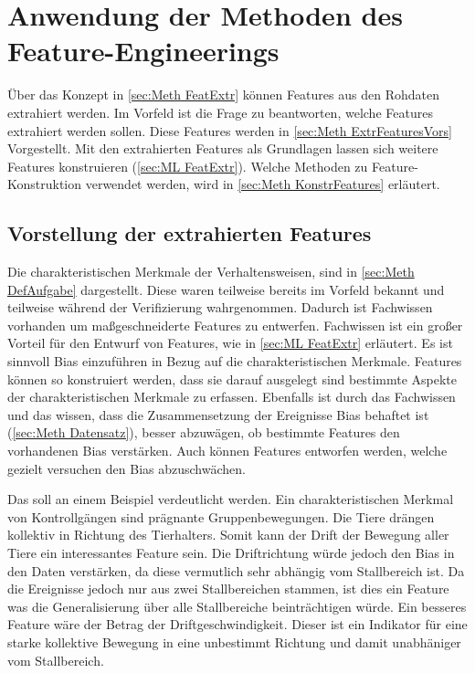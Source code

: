 \section{Anwendung der Methoden des Feature-Engineerings}
Über das Konzept in \autoref{sec:Meth FeatExtr} können Features aus den Rohdaten extrahiert werden. Im Vorfeld ist die Frage zu beantworten, welche Features extrahiert werden sollen. Diese Features werden in \autoref{sec:Meth ExtrFeaturesVors} Vorgestellt. Mit den extrahierten Features als Grundlagen lassen sich weitere Features konstruieren (\autoref{sec:ML FeatExtr}). Welche Methoden zu Feature-Konstruktion verwendet werden, wird in \autoref{sec:Meth KonstrFeatures} erläutert.


\subsection{Vorstellung der extrahierten Features} \label{sec:Meth ExtrFeaturesVors}
Die charakteristischen Merkmale der Verhaltensweisen, sind in \autoref{sec:Meth DefAufgabe} dargestellt. Diese waren teilweise bereits im Vorfeld bekannt und teilweise während der Verifizierung wahrgenommen. Dadurch ist Fachwissen vorhanden um maßgeschneiderte Features zu entwerfen. Fachwissen ist ein großer Vorteil für den Entwurf von Features, wie in \autoref{sec:ML FeatExtr} erläutert. Es ist sinnvoll Bias einzuführen in Bezug auf die charakteristischen Merkmale. Features können so konstruiert werden, dass sie darauf ausgelegt sind bestimmte Aspekte der charakteristischen Merkmale zu erfassen. Ebenfalls ist durch das Fachwissen und das wissen, dass die Zusammensetzung der Ereignisse Bias behaftet ist (\autoref{sec:Meth Datensatz}), besser abzuwägen, ob bestimmte Features den vorhandenen Bias verstärken. Auch können Features entworfen werden, welche gezielt versuchen den Bias abzuschwächen. \par

Das soll an einem Beispiel verdeutlicht werden. Ein charakteristischen Merkmal von Kontrollgängen sind prägnante Gruppenbewegungen. Die Tiere drängen kollektiv in Richtung des Tierhalters. Somit kann der Drift der Bewegung aller Tiere ein interessantes Feature sein. Die Driftrichtung würde jedoch den Bias in den Daten verstärken, da diese vermutlich sehr abhängig vom Stallbereich ist. Da die Ereignisse jedoch nur aus zwei Stallbereichen stammen, ist dies ein Feature was die Generalisierung über alle Stallbereiche beinträchtigen würde. Ein besseres Feature wäre der Betrag der Driftgeschwindigkeit. Dieser ist ein Indikator für eine starke kollektive Bewegung in eine unbestimmt Richtung und damit unabhäniger vom Stallbereich. \par 

